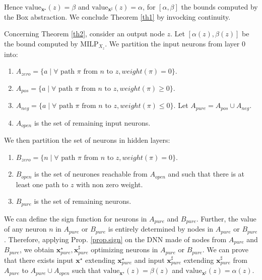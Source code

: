 \documentclass{llncs}
\newcommand{\vx}{\boldsymbol{x}}
\newcommand{\val}{{\textrm{value}}}
\newcommand{\MILP}{{\textrm{MILP}}}
\begin{document}
Hence $\val_{\vx^\star}(z)=\beta$ and $\val_{\vx^\sharp}(z)=\alpha$,
for $[\alpha, \beta]$ the bounds computed by the Box abstraction. We conclude Theorem \ref{th1} by invocking continuity.

\smallskip

Concerning Theorem \ref{th2}, consider an output node $z$.
Let $[\alpha(z),\beta(z)]$ be the bound computed by $\MILP_{X_z}$.
We partition the input neurons from layer $0$ into:
\begin{enumerate}
	\item $A_{zero}= \{a \mid \forall \text{ path $\pi$ from $n$ to } z, weight(\pi)=0\}$.
	\item $A_{pos}= \{a \mid \forall \text{ path $\pi$ from $n$ to } z, weight(\pi)\geq0\}$.
	\item  $A_{neg}= \{a \mid \forall \text{ path $\pi$ from $n$ to } z, weight(\pi)\leq0\}$.
	Let $A_{pure}=A_{pos} \cup A_{neg}$.
	\item $A_{open}$ is the set of remaining input neurons.
\end{enumerate}

We then partition the set of neurons in hidden layers: 
\begin{enumerate}
	\item $B_{zero}= \{n \mid \forall \text{ path $\pi$ from $n$ to } z, weight(\pi)=0\}$.
	\item $B_{open}$ is the set of neurones reachable from $A_{open}$ and such that there is at least one path to $z$ with non zero weight.
	\item $B_{pure}$ is the set of remaining neurons.
\end{enumerate}

We can define the sign function for neurons in $A_{pure}$ and $B_{pure}$.
Further, the value of any neuron $n$ in $A_{pure}$ or $B_{pure}$ is entirely determined by 
nodes in $A_{pure}$ or $B_{pure}$. Therefore, applying Prop. \ref{prop.sign} on the DNN
made of nodes from $A_{pure}$ and $B_{pure}$, we obtain 
$\vx_{pure}^\star,\vx_{pure}^\sharp$ optimizing neurons in $A_{pure}$ or $B_{pure}$.
We can prove that there exists input 
$\vx^\star$ extending $\vx_{pure}^\star$
and input $\vx_{pure}^\sharp$ extending $\vx_{pure}^\sharp$
from $A_{pure}$ to $A_{pure} \cup A_{open}$ such that 
$\val_{\vx^\star}(z)=\beta(z)$ and $\val_{\vx^\sharp}(z)=\alpha(z)$.
\end{document}
